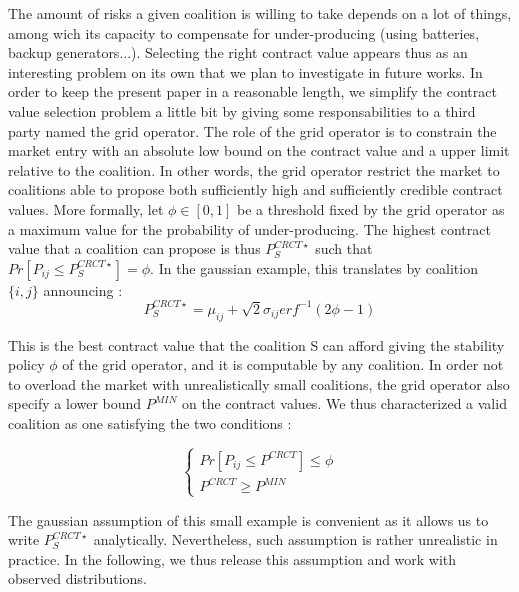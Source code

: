 \documentclass[conference]{IEEEtran}
\begin{document}
The amount of risks a given coalition is willing to take depends on a lot of things, among wich its capacity to compensate for under-producing (using batteries, backup generators...). Selecting the right contract value appears thus as an interesting problem on its own that we plan to investigate in future works. In order to keep the present paper in a reasonable length, we simplify the contract value selection problem a little bit by giving some responsabilities to a third party named the grid operator. The role of the grid operator is to constrain the market entry with an absolute low bound on the contract value and a upper limit relative to the coalition. In other words, the grid operator restrict the market to coalitions able to propose both sufficiently high and sufficiently credible contract values. More formally, let $ \phi \in [0,1] $ be a threshold fixed by the grid operator as a maximum value for the probability of under-producing. The highest contract value that a coalition can propose is thus $ P_{S}^{CRCT \star} $ such that $ Pr[P_{ij} \leq P_{S}^{CRCT \star}] = \phi $. In the gaussian example, this translates by coalition $ \{i,j\}$ announcing :
\begin{equation}
P_{S}^{CRCT \star} = \mu_{ij} + \sqrt{2} \sigma_{ij} erf^{-1}(2 \phi - 1 )
\end{equation}

This is the best contract value that the coalition S can afford giving the stability policy $\phi$ of the grid operator, and it is computable by any coalition. In order not to overload the market with unrealistically small coalitions, the grid operator also specify a lower bound $ P^{MIN} $ on the contract values. We thus characterized a valid coalition as one satisfying the two conditions :

\begin{equation}
\left\{ \begin{array}{lll}
			Pr[P_{ij} \leq P^{CRCT}] \leq \phi \\
			P^{CRCT} \geq P^{MIN}
\end{array} \right.
\end{equation}

The gaussian assumption of this small example is convenient as it allows us to write $ P_{S}^{CRCT \star} $ analytically. Nevertheless, such assumption is rather unrealistic in practice. In the following, we thus release this assumption and work with observed distributions.

%
%
\end{document}
